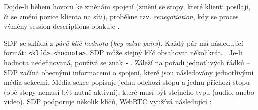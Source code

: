 Dojde-li během hovoru ke změnám spojení (změní se stopy, které klienti posílají,
či se změní pozice klienta na síti), proběhne tzv. \textit{renegotiation}, kdy
se proces výměny session descriptions opakuje
\parencite{MozillaBlog-PerfectNegotiation}.

SDP se skládá z \textit{párů klíč-hodnota} (\textit{key-value pairs}). Každý pár
má následující formát: \texttt{<klíč>=<hodnota>}. SDP může stejný klíč
obsahovat několikrát. \parencite{WebRTCForTheCurious}. Je-li hodnota nedefinovaná,
používá se znak \texttt{-} \parencite{IETF-RFC8866}. Záleží na pořadí
jednotlivých řádků -- SDP začíná obecnými informacemi o spojení, které jsou
následovány jednotlivými média-sekcemi. Média-sekce popisuje jednu odchozí stopu
a jednu příchozí stopu (obě stopy nemusí být nutně aktivní), které musí být
stejného typu (audio, anebo video). SDP podporuje několik klíčů, WebRTC využívá
následující \parencite{WebRTCForTheCurious,IETF-RFC8866}:

